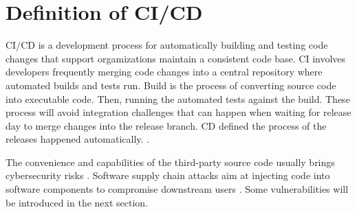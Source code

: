 \section{Definition of CI/CD}
CI/CD is a development process for automatically building and testing code changes 
that support orgamizations maintain a consistent code base. CI involves developers
frequently merging code changes into a central repository where automated builds
and tests run. Build is the process of converting source code into executable 
code. Then, running the automated tests against the build. These process will avoid
integration challenges that can happen when waiting for release day to merge changes into the
release branch. CD defined the process of the releases happened automatically. \cite{DoDDefCI/CD2023}. 


The convenience and capabilities of the third-party source code usually 
brings cybersecurity risks \cite{mastrangelo2015use}. Software supply 
chain attacks aim at injecting code into software components to compromise
downstream users \cite{ladisa2023sok}. Some vulnerabilities will be introduced 
in the next section.